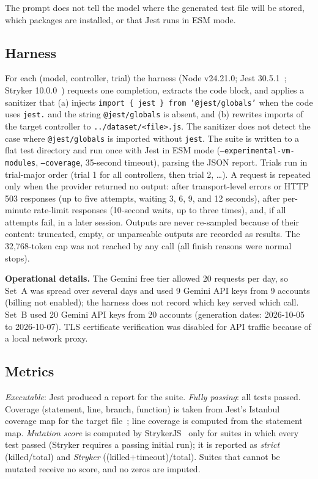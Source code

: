 \documentclass[sigconf]{acmart}
\begin{document}
The prompt does not tell the model where the generated test file will be stored, which packages are installed, or that Jest runs in ESM mode.

\subsection{Harness}
For each (model, controller, trial) the harness (Node v24.21.0; Jest 30.5.1~\cite{jest2026}; Stryker 10.0.0~\cite{stryker2026}) requests one completion, extracts the code block, and applies a sanitizer that (a) injects \texttt{import \{ jest \} from '@jest/globals'} when the code uses \texttt{jest.} and the string \texttt{@jest/globals} is absent, and (b) rewrites imports of the target controller to \texttt{../dataset/<file>.js}. The sanitizer does not detect the case where \texttt{@jest/globals} is imported without \texttt{jest}. The suite is written to a flat test directory and run once with Jest in ESM mode (\texttt{--experimental-vm-modules}, \texttt{--coverage}, 35-second timeout), parsing the JSON report. Trials run in trial-major order (trial 1 for all controllers, then trial 2, \dots). A request is repeated only when the provider returned no output: after transport-level errors or HTTP 503 responses (up to five attempts, waiting 3, 6, 9, and 12 seconds), after per-minute rate-limit responses (10-second waits, up to three times), and, if all attempts fail, in a later session. Outputs are never re-sampled because of their content: truncated, empty, or unparseable outputs are recorded as results. The 32{,}768-token cap was not reached by any call (all finish reasons were normal stops).

\textbf{Operational details.} The Gemini free tier allowed 20 requests per day, so Set~A was spread over several days and used 9 Gemini API keys from 9 accounts (billing not enabled); the harness does not record which key served which call. Set~B used 20 Gemini API keys from 20 accounts (generation dates: 2026-10-05 to 2026-10-07). TLS certificate verification was disabled for API traffic because of a local network proxy.

\subsection{Metrics}
\textit{Executable}: Jest produced a report for the suite. \textit{Fully passing}: all tests passed. Coverage (statement, line, branch, function) is taken from Jest's Istanbul coverage map for the target file~\cite{istanbul2026}; line coverage is computed from the statement map. \textit{Mutation score} is computed by StrykerJS~\cite{stryker2026} only for suites in which every test passed (Stryker requires a passing initial run); it is reported as \emph{strict} (killed/total) and \emph{Stryker} ((killed+timeout)/total). Suites that cannot be mutated receive no score, and no zeros are imputed.
\end{document}
